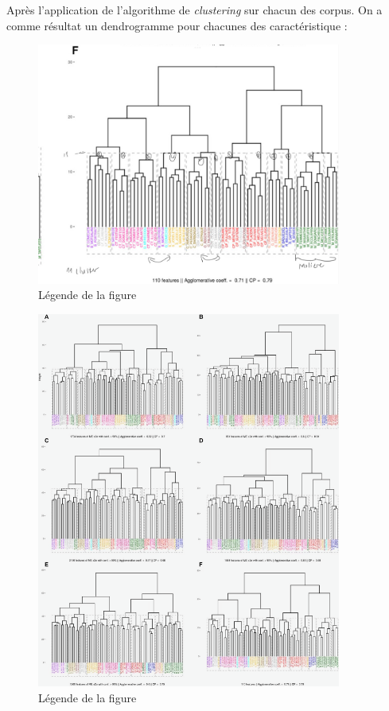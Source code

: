 \vspace{\baselineskip}
Après l’application de l’algorithme de \textit{clustering} sur chacun des
corpus. On a comme résultat un dendrogramme pour chacunes des caractéristique :

\begin{figure}[htbp]
    \centering
    \includegraphics[width=10cm]{Ressources/IMG_0552.png}
    \caption{Légende de la figure}
    \label{fig:images}
  \end{figure}
  \vspace{\baselineskip}

  \begin{figure}[htbp]
    \centering
    \includegraphics[width=10cm]{Ressources/Fig. 1 JPEG-1.png}
    \caption{Légende de la figure}
    \label{fig:images}
  \end{figure}
  

